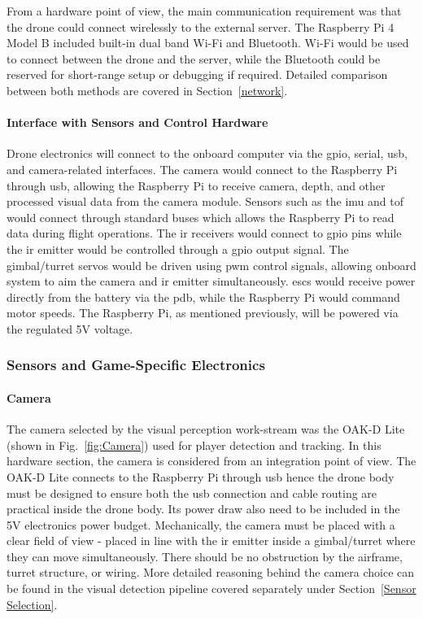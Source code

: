 \documentclass{report_template_oxford}
\begin{document}
From a hardware point of view, the main communication requirement was that the drone could connect wirelessly to the external server. The Raspberry Pi 4 Model B included built-in dual band Wi-Fi and Bluetooth. Wi-Fi would be used to connect between the drone and the server, while the Bluetooth could be reserved for short-range setup or debugging if required. Detailed comparison between both methods are covered in Section~\ref{network}.

\paragraph{Interface with Sensors and Control Hardware}

Drone electronics will connect to the onboard computer via the \gls{gpio}, serial, \gls{usb}, and camera-related interfaces. The camera would connect to the Raspberry Pi through \gls{usb}, allowing the Raspberry Pi to receive camera, depth, and other processed visual data from the camera module. Sensors such as the \gls{imu} and \gls{tof} would connect through standard buses which allows the Raspberry Pi to read data during flight operations. The \gls{ir} receivers would connect to \gls{gpio} pins while the \gls{ir} emitter would be controlled through a \gls{gpio} output signal. The gimbal/turret servos would be driven using \gls{pwm} control signals, allowing onboard system to aim the camera and \gls{ir} emitter simultaneously. \gls{esc}s would receive power directly from the battery via the \gls{pdb}, while the Raspberry Pi would command motor speeds. The Raspberry Pi, as mentioned previously, will be powered via the regulated 5V voltage.

\subsubsection{Sensors and Game-Specific Electronics} \label{sensorArray}

\paragraph{Camera}

The camera selected by the visual perception work-stream was the OAK-D Lite (shown in Fig.~\ref{fig:Camera}) used for player detection and tracking. In this hardware section, the camera is considered from an integration point of view. The OAK-D Lite connects to the Raspberry Pi through \gls{usb} hence the drone body must be designed to ensure both the \gls{usb} connection and cable routing are practical inside the drone body. Its power draw also need to be included in the 5V electronics power budget. Mechanically, the camera must be placed with a clear field of view - placed in line with the \gls{ir} emitter inside a gimbal/turret where they can move simultaneously. There should be no obstruction by the airframe, turret structure, or wiring. More detailed reasoning behind the camera choice can be found in the visual detection pipeline covered separately under Section~\ref{Sensor Selection}.
\end{document}
